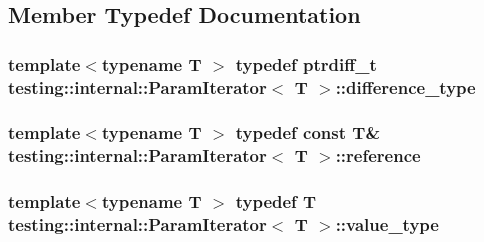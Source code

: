 \subsection{Member Typedef Documentation}
\hypertarget{classtesting_1_1internal_1_1ParamIterator_a6c37240a04ba3fc4c56f6c413cf4771d}{
\subsubsection[{difference\-\_\-type}]{\setlength{\rightskip}{0pt plus 5cm}template$<$typename T $>$ typedef ptrdiff\-\_\-t {\bf testing\-::internal\-::\-Param\-Iterator}$<$ {\bf T} $>$\-::{\bf difference\-\_\-type}}}\label{classtesting_1_1internal_1_1ParamIterator_a6c37240a04ba3fc4c56f6c413cf4771d}
\hypertarget{classtesting_1_1internal_1_1ParamIterator_ac96f133ffa06fc0f9faff5a1c7954382}{
\subsubsection[{reference}]{\setlength{\rightskip}{0pt plus 5cm}template$<$typename T $>$ typedef const {\bf T}\& {\bf testing\-::internal\-::\-Param\-Iterator}$<$ {\bf T} $>$\-::{\bf reference}}}\label{classtesting_1_1internal_1_1ParamIterator_ac96f133ffa06fc0f9faff5a1c7954382}
\hypertarget{classtesting_1_1internal_1_1ParamIterator_a4afe3a68db0d0744753c8afe262e35df}{
\subsubsection[{value\-\_\-type}]{\setlength{\rightskip}{0pt plus 5cm}template$<$typename T $>$ typedef {\bf T} {\bf testing\-::internal\-::\-Param\-Iterator}$<$ {\bf T} $>$\-::{\bf value\-\_\-type}}}\label{classtesting_1_1internal_1_1ParamIterator_a4afe3a68db0d0744753c8afe262e35df}


